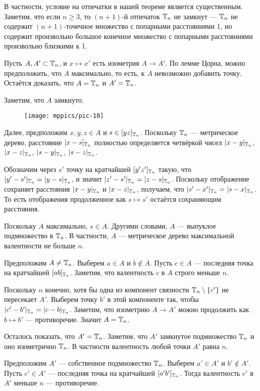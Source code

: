\documentclass[a4paper,10pt]{article}
\begin{document}
В частности, условие на отпечатки в нашей теореме является существенным.
Заметим, что если $n\ge 3$, то $(n+1)$-й отпечаток $\mathbb{T}_n$ не замкнут --- $\mathbb{T}_n$ не содержит $(n+1)$-точечное множество с попарными расстояниями 1, 
но содержит произвольно большое конечное множество с  попарными расстояниями произвольно близкими к 1.


Пусть $A, A'\subset \mathbb{T}_n$, и $x\mapsto x'$ есть изометрия $A\to A'$.
По лемме Цорна, можно предположить, что $A$ максимально,
то есть, к $A$ невозможно добавить точку.
Остаётся доказать, что $A=\mathbb{T}_n$ и $A'=\mathbb{T}_n$.

Заметим, что $A$ замкнуто.

\begin{wrapfigure}{o}{23 mm}
\vskip-6mm
\centering
\texttt{[image: mppics/pic-10]}
\end{wrapfigure}

Далее, предположим $x,y,z\in A$ и $s\in [yz]_{\mathbb{T}_n}$.
Поскольку $\mathbb{T}_n$ --- метрическое дерево, расстояние $|x-s|_{\mathbb{T}_n}$ полностью определяется четвёркой чисел 
$|x-y|_{\mathbb{T}_n}$, $|x-z|_{\mathbb{T}_n}$, $|s-y|_{\mathbb{T}_n}$, $|s-z|_{\mathbb{T}_n}$.

Обозначим через $s'$ точку на кратчайшей $[y'z']_{\mathbb{T}_n}$ такую, что $|y'-s'|_{\TT_n}\z=|y-s|_{\TT_n}$, и значит $|z'-s'|_{\mathbb{T}_n}=|z-s|_{\mathbb{T}_n}$.
Поскольку отображение сохраняет расстояния $|x-y|_{\mathbb{T}_n}$ и $|x-z|_{\mathbb{T}_n}$,
получаем, что $|s'-x'|_{\mathbb{T}_n}=|s-x|_{\mathbb{T}_n}$.
То есть отображения продолженное как $s\mapsto s'$ остаётся сохраняющим расстояния.

Поскольку $A$ максимально, $s\in A$.
Другими словами, $A$ --- выпуклое подмножество в $\mathbb{T}_n$.
В частности, $A$ --- метрическое дерево максимальной валентности не больше $n$.

Предположим $A\ne \mathbb{T}_n$.
Выберем $a\in A$ и $b\notin A$.
Пусть $c\in A$ --- последняя точка на кратчайшей $[ab]_{\mathbb{T}_n}$.
Заметим, что валентность $c$ в $A$ строго меньше $n$.

Поскольку $n$ конечно, хотя бы одна из компонент связности $\TT_n\z\setminus \{c'\}$ не пересекает $A'$.
Выберем точку $b'$ в этой компоненте так, чтобы $|c'-b'|_{\TT_n}\z=|c-b|_{\TT_n}$.
Заметим, что изометрию $A\to A'$ можно продолжить как $b\mapsto b'$ --- противоречие.
Значит $A=\mathbb{T}_n$.

Осталось показать, что $A'=\mathbb{T}_n$.
Заметим, что $A'$ замкнутое подмножество $\mathbb{T}_n$ и оно изометрично $\mathbb{T}_n$.
В частности валентность любой точки $A'$ равна $n$.

Предположим $A'$ --- собственное подмножество $\mathbb{T}_n$.
Выберем $a'\in A'$ и $b'\notin A'$.
Пусть $c'\in A'$ --- последняя точка на кратчайшей $[a'b']_{\mathbb{T}_n}$.
Тогда валентность $c'$ в $A'$ меньше $n$ --- противоречие.
\qeds
\end{document}

